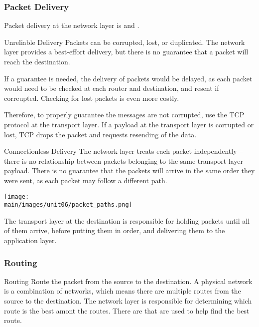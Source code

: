 \documentclass[\main/notes.tex]{subfiles}
\begin{document}
				\subsubsection{Packet Delivery}
					Packet delivery at the network layer is  and .
					\begin{definition}{Unreliable Delivery}
						Packets can be corrupted, lost, or duplicated. The network layer provides a best-effort delivery, but there is no guarantee that a packet will reach the destination.

						If a guarantee is needed, the delivery of packets would be delayed, as each packet would need to be checked at each router and destination, and resent if correupted. Checking for lost packets is even more costly.

						Therefore, to properly guarantee the messages are not corrupted, use the TCP protocol at the transport layer. If a payload at the transport layer is corrupted or lost, TCP drops the packet and requests resending of the data.
					\end{definition}
					\begin{definition}{Connectionless Delivery}
						The network layer treats each packet independently -- there is no relationship between packets belonging to the same transport-layer payload. There is no guarantee that the packets will arrive in the same order they were sent, as each packet may follow a different path.
						\begin{center}
							\texttt{[image: \\main/images/unit06/packet\_paths.png]}
						\end{center}
						The transport layer at the destination is responsible for holding packets until all of them arrive, before putting them in order, and delivering them to the application layer.
					\end{definition}
				\subsubsection{Routing}
					\begin{definition}{Routing}
						Route the packet from the source to the destination. A physical network is a combination of networks, which means there are multiple routes from the source to the destination. The network layer is responsible for determining which route is the best amont the routes. There are  that are used to help find the best route.
					\end{definition}
\end{document}
